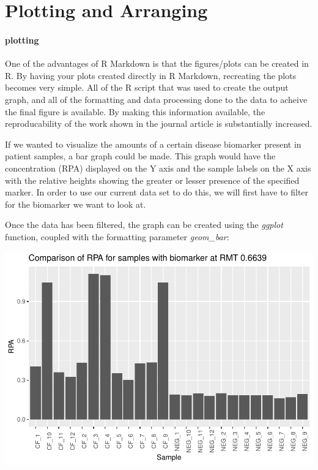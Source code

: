 \documentclass[]{elsarticle} %
\makeatletter
\def\maxwidth{\ifdim\Gin@nat@width>\linewidth\linewidth
\else\Gin@nat@width\fi}
\let\Oldincludegraphics\includegraphics
\renewcommand{\includegraphics}[1]{\Oldincludegraphics[width=\maxwidth]{#1}}
\makeatother
\begin{document}
\hypertarget{plotting-and-arranging}{%
\section{Plotting and Arranging}\label{plotting-and-arranging}}

\hypertarget{plotting}{%
\paragraph{plotting}\label{plotting}}

One of the advantages of R Markdown is that the figures/plots can be
created in R. By having your plots created directly in R Markdown,
recreating the plots becomes very simple. All of the R script that was
used to create the output graph, and all of the formatting and data
processing done to the data to acheive the final figure is available. By
making this information available, the reproducability of the work shown
in the journal article is substantially increased.

If we wanted to visualize the amounts of a certain disease biomarker
present in patient samples, a bar graph could be made. This graph would
have the concentration (RPA) displayed on the Y axis and the sample
labels on the X axis with the relative heights showing the greater or
lesser presence of the specified marker. In order to use our current
data set to do this, we will first have to filter for the biomarker we
want to look at.

Once the data has been filtered, the graph can be created using the
\emph{ggplot} function, coupled with the formatting parameter
\emph{geom\_bar}:

\includegraphics{06DecFinalDeliverableArticle_files/figure-latex/creating the filtered bar graph, fig2-1.pdf}
\end{document}
